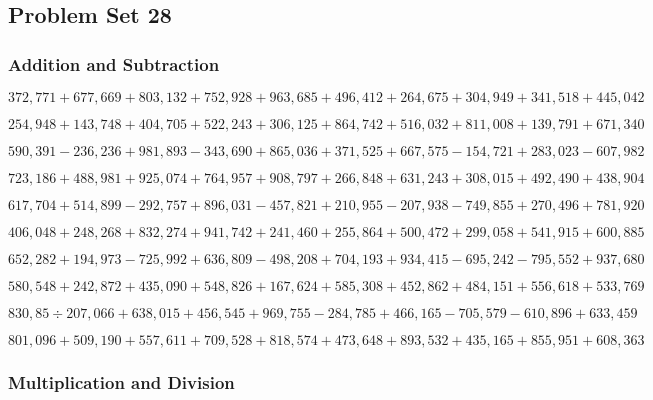 \hypertarget{problem-set-28-5}{%
\subsection{Problem Set 28}\label{problem-set-28-5}}

\hypertarget{addition-and-subtraction-333}{%
\subsubsection{Addition and
Subtraction}\label{addition-and-subtraction-333}}

\(372,771+677,669+803,132+752,928+963,685+496,412+264,675+304,949+341,518+ 445,042\)

\(254,948+143,748+404,705+522,243+306,125+864,742+516,032+811,008+139,791+671,340\)

\(590,391-236,236+981,893-343,690+865,036+371,525+667,575-154,721+283,023-607,982\)

\(723,186+488,981+925,074+764,957+908,797+266,848+631,243+308,015+492,490+438,904\)

\(617,704+514,899-292,757+896,031-457,821+210,955-207,938-749,855+270,496+781,920\)

\(406,048+248,268+832,274+941,742+241,460+255,864+500,472+299,058+541,915+600,885\)

\(652,282+194,973-725,992+636,809-498,208+704,193+934,415-695,242-795,552+937,680\)

\(580,548+242,872+435,090+548,826+167,624+585,308+452,862+484,151+556,618+533,769\)

\(830,85÷207,066+638,015+456,545+969,755-284,785+466,165-705,579-610,896+633,459\)

\(801,096+509,190+557,611+709,528+818,574+473,648+893,532+435,165+855,951+608,363\)

\hypertarget{multiplication-and-division-332}{%
\subsubsection{Multiplication and
Division}\label{multiplication-and-division-332}}

